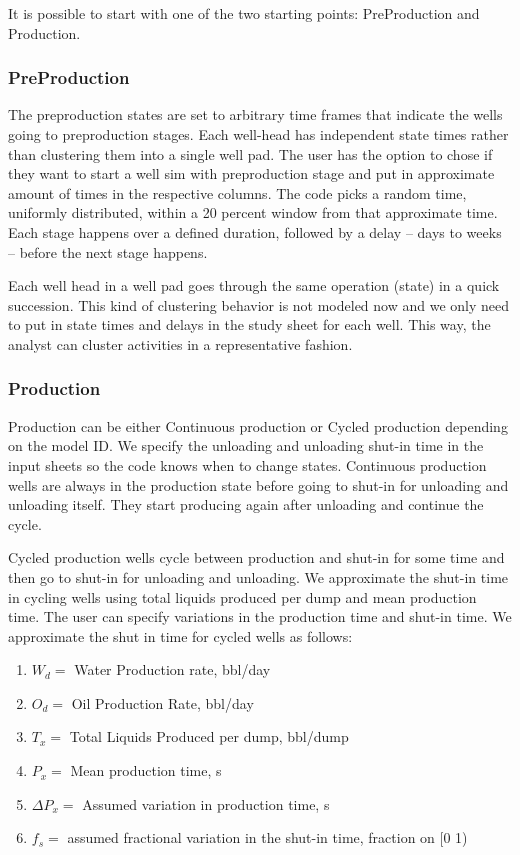 
It is possible to start with one of the two starting points: PreProduction and Production.
\subsubsection{PreProduction}
The preproduction states are set to arbitrary time frames that indicate the wells going to preproduction stages. Each well-head has independent state times rather than clustering them into a single well pad. The user has the option to chose if they want to start a well sim with preproduction stage and put in approximate amount of times in the respective columns. The code picks a random time, uniformly distributed, within a 20 percent window from that approximate time. Each stage happens over a defined duration, followed by a delay – days to weeks – before the next stage happens. 
\par Each well head in a well pad goes through the same operation (state) in a quick succession. This kind of clustering behavior is not modeled now and we only need to put in state times and delays in the study sheet for each well. This way, the analyst can cluster activities in a representative fashion.

\subsubsection{Production}
\par Production can be either Continuous production or Cycled production depending on the model ID. We specify the unloading and unloading shut-in time in the input sheets so the code knows when to change states. Continuous production wells are always in the production state before going to shut-in for unloading and unloading itself. They start producing again after unloading and continue the cycle.
\par Cycled production wells cycle between production and shut-in for some time and then go to shut-in for unloading and unloading. We approximate the shut-in time in cycling wells using total liquids produced per dump and mean production time. The user can specify variations in the production time and shut-in time. We approximate the shut in time for cycled wells as follows:
\begin{enumerate}
	\item[] $W_d=$ Water Production rate, bbl/day
	\item[] $O_d=$ Oil Production Rate, bbl/day
	\item[] $T_x=$ Total Liquids Produced per dump, bbl/dump
	\item[] $P_x=$ Mean production time, s
	\item[] $\Delta P_x=$ Assumed variation in production time, s
	\item[] $f_s=$ assumed fractional variation in the shut-in time, fraction on [0 1)
\end{enumerate}


